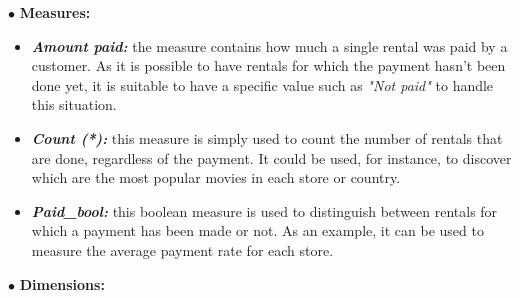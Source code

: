 \documentclass[
10pt,
a4paper,
oneside,
headinclude,
footinclude]{article}
\begin{document}
$\bullet$ \textbf{Measures:}
\vspace{-4mm}
\begin{itemize}
    \item \textbf{\textit{Amount paid:}} the measure contains how much a single rental was paid by a customer. As it is possible to have rentals for which the payment hasn't been done yet, it is suitable to have a specific value such as \textit{"Not paid"} to handle this situation.
    \item \textbf{\textit{Count (*):}} this measure is simply used to count the number of rentals that are done, regardless of the payment. It could be used, for instance, to discover which are the most popular movies in each store or country.
    \item \textbf{\textit{Paid\_bool:}} this boolean measure is used to distinguish between rentals for which a payment has been made or not. As an example, it can be used to measure the average payment rate for each store.
\end{itemize}
$\bullet$ \textbf{Dimensions:}
\vspace{-4mm}
\end{document}
